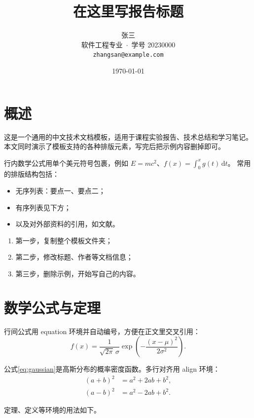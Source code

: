\documentclass[11pt,a4paper]{article}
\title{\textbf{在这里写报告标题}}
\author{张三 \\
  软件工程专业 \,$\cdot$\, 学号 20230000 \\
  \texttt{zhangsan@example.com}}
\date{\today}   %
\theoremstyle{definition}
\theoremstyle{remark}
\begin{document}
\maketitle


\section{概述}

这是一个通用的中文技术文档模板，适用于课程实验报告、技术总结和学习笔记。
本文同时演示了模板支持的各种排版元素，写完后把示例内容删掉即可。

行内数学公式用单个美元符号包裹，例如 $E = mc^2$、$f(x)=\int_0^x g(t)\,\mathrm{d}t$。
常用的排版结构包括：

\begin{itemize}[itemsep=2pt,topsep=4pt]
  \item 无序列表：要点一、要点二；
  \item 有序列表见下方；
  \item 以及对外部资料的引用，如文献\cite{knuth1997taocp}。
\end{itemize}

\begin{enumerate}[itemsep=2pt,topsep=4pt]
  \item 第一步，复制整个模板文件夹；
  \item 第二步，修改标题、作者等文档信息；
  \item 第三步，删除示例，开始写自己的内容。
\end{enumerate}

\section{数学公式与定理}

行间公式用 equation 环境并自动编号，方便在正文里交叉引用：
\begin{equation}
  \label{eq:gaussian}
  f(x) = \frac{1}{\sqrt{2\pi}\,\sigma}
         \exp\!\left(-\frac{(x-\mu)^2}{2\sigma^2}\right).
\end{equation}

公式\eqref{eq:gaussian}是高斯分布的概率密度函数。多行对齐用 align 环境：
\begin{align}
  (a+b)^2 & = a^2 + 2ab + b^2, \\
  (a-b)^2 & = a^2 - 2ab + b^2.
\end{align}

定理、定义等环境的用法如下。
\end{document}
